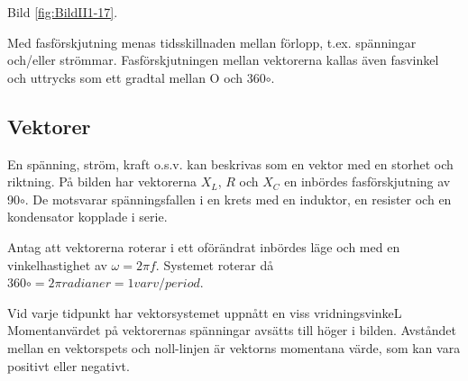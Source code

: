 Bild \ref{fig:BildII1-17}.

Med fasförskjutning menas tidsskillnaden mellan förlopp, t.ex. spänningar och/eller
strömmar. Fasförskjutningen mellan vektorerna kallas även fasvinkel och uttrycks
som ett gradtal mellan O och 360\(\circ\).

\subsection{Vektorer}

En spänning, ström, kraft o.s.v. kan beskrivas som en vektor med en storhet och riktning.
På bilden har vektorerna \(X_L\), \(R\) och \(X_C\) en inbördes fasförskjutning av 90\(\circ\).
De motsvarar spänningsfallen i en krets med en induktor, en resister och en kondensator
kopplade i serie.

Antag att vektorerna roterar i ett oförändrat inbördes läge och med en vinkelhastighet
av \(\omega= 2\pi f\). Systemet roterar då \(360\circ = 2\pi radianer = 1 varv/period\).

Vid varje tidpunkt har vektorsystemet uppnått en viss vridningsvinkeL Momentanvärdet på
vektorernas spänningar avsätts till höger i bilden. Avståndet mellan en vektorspets och
noll-linjen är vektorns momentana värde, som kan vara positivt eller negativt.
